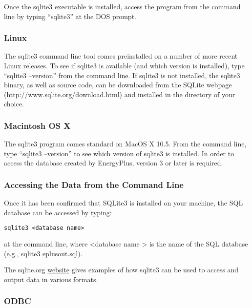 Once the sqlite3 executable is installed, access the program from the command line by typing ``sqlite3'' at the DOS prompt.

\subsubsection{Linux}\label{linux}

The sqlite3 command line tool comes preinstalled on a number of more recent Linux releases. To see if sqlite3 is available (and which version is installed), type ``sqlite3 --version'' from the command line. If sqlite3 is not installed, the sqlite3 binary, as well as source code, can be downloaded from the SQLite webpage (http://www.sqlite.org/download.html) and installed in the directory of your choice.

\subsubsection{Macintosh OS X}\label{macintosh-os-x}

The sqlite3 program comes standard on MacOS X 10.5. From the command line, type ``sqlite3 --version'' to see which version of sqlite3 is installed. In order to access the database created by EnergyPlus, version 3 or later is required.

\subsubsection{Accessing the Data from the Command Line}\label{accessing-the-data-from-the-command-line}

Once it has been confirmed that SQLite3 is installed on your machine, the SQL database can be accessed by typing:

\begin{lstlisting}
sqlite3 <database name>
\end{lstlisting}

at the command line, where \textless{}database name \textgreater{} is the name of the SQL database (e.g., sqlite3 eplusout.sql).

The sqlite.org \href{http://www.sqlite.org/sqlite.html}{website} gives examples of how sqlite3 can be used to access and output data in various formats.

\subsubsection{ODBC}\label{odbc}

